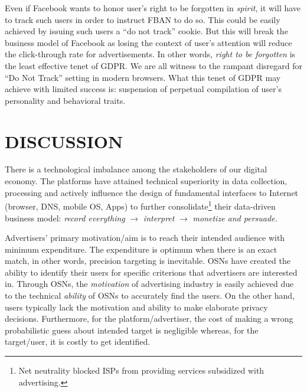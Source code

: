 \documentclass[a4paper,twoside]{article}
\begin{document}
Even if Facebook wants to honor user's right to be forgotten in
\textit{spirit}, it will have to track such users in order to instruct
FBAN to do so. This could be easily achieved by issuing such users a
``do not track'' cookie. But this will break the business model of
Facebook as losing the context of user's attention will reduce the
click-through rate for advertisements. In other words, \textit{right
  to be forgotten} is the least effective tenet of GDPR. We are all
witness to the rampant disregard for ``Do Not Track'' setting in
modern browsers. What this tenet of GDPR may achieve with limited
success is: suspension of perpetual compilation of user's personality
and behavioral traits.



\section{DISCUSSION}
\label{sec:discussion}
\noindent There is a technological imbalance among the stakeholders of
our digital economy. The platforms have attained technical superiority
in data collection, processing and actively influence the design of
fundamental interfaces to Internet (browser, DNS, mobile OS, Apps) to
further consolidate\footnote{Net neutrality blocked ISPs from
  providing services subsidized with advertising.} their data-driven
business model: \textit{record everything} $\rightarrow$
\textit{interpret} $\rightarrow$ \textit{monetize and persuade.}

Advertisers' primary motivation/aim is to reach their intended
audience with minimum expenditure. The expenditure is optimum when
there is an exact match, in other words, precision targeting is
inevitable. OSNs have created the ability to identify their users for
specific criterions that advertisers are interested in. Through OSNs,
the \textit{motivation} of advertising industry is easily achieved due
to the technical \textit{ability} of OSNs to accurately find the
users. On the other hand, users typically lack the motivation and
ability to make elaborate privacy decisions. Furthermore, for the
platform/advertiser, the cost of making a wrong probabilistic guess
about intended target is negligible whereas, for the target/user, it
is costly to get identified.
\end{document}
